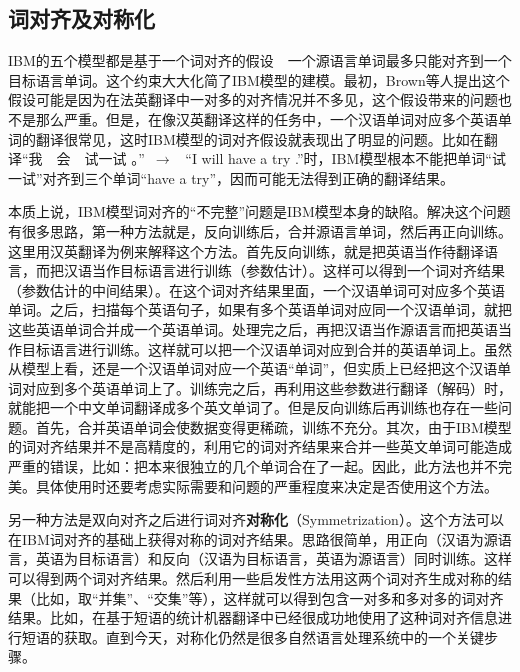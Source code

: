 \subsection{词对齐及对称化}

\parinterval IBM的五个模型都是基于一个词对齐的假设\ \dash \ 一个源语言单词最多只能对齐到一个目标语言单词。这个约束大大化简了IBM模型的建模。最初，Brown等人提出这个假设可能是因为在法英翻译中一对多的对齐情况并不多见，这个假设带来的问题也不是那么严重。但是，在像汉英翻译这样的任务中，一个汉语单词对应多个英语单词的翻译很常见，这时IBM模型的词对齐假设就表现出了明显的问题。比如在翻译``我\ \ 会\ \ 试一试 。''\ $\to$ \ ``I will have a try .''时，IBM模型根本不能把单词``试一试''对齐到三个单词``have a try''，因而可能无法得到正确的翻译结果。

\parinterval 本质上说，IBM模型词对齐的``不完整''问题是IBM模型本身的缺陷。解决这个问题有很多思路，第一种方法就是，反向训练后，合并源语言单词，然后再正向训练。这里用汉英翻译为例来解释这个方法。首先反向训练，就是把英语当作待翻译语言，而把汉语当作目标语言进行训练（参数估计）。这样可以得到一个词对齐结果（参数估计的中间结果）。在这个词对齐结果里面，一个汉语单词可对应多个英语单词。之后，扫描每个英语句子，如果有多个英语单词对应同一个汉语单词，就把这些英语单词合并成一个英语单词。处理完之后，再把汉语当作源语言而把英语当作目标语言进行训练。这样就可以把一个汉语单词对应到合并的英语单词上。虽然从模型上看，还是一个汉语单词对应一个英语``单词''，但实质上已经把这个汉语单词对应到多个英语单词上了。训练完之后，再利用这些参数进行翻译（解码）时，就能把一个中文单词翻译成多个英文单词了。但是反向训练后再训练也存在一些问题。首先，合并英语单词会使数据变得更稀疏，训练不充分。其次，由于IBM模型的词对齐结果并不是高精度的，利用它的词对齐结果来合并一些英文单词可能造成严重的错误，比如：把本来很独立的几个单词合在了一起。因此，此方法也并不完美。具体使用时还要考虑实际需要和问题的严重程度来决定是否使用这个方法。

\parinterval 另一种方法是双向对齐之后进行词对齐{\small\sffamily\bfseries{对称化}}（Symmetrization）。这个方法可以在IBM词对齐的基础上获得对称的词对齐结果。思路很简单，用正向（汉语为源语言，英语为目标语言）和反向（汉语为目标语言，英语为源语言）同时训练。这样可以得到两个词对齐结果。然后利用一些启发性方法用这两个词对齐生成对称的结果（比如，取``并集''、``交集''等），这样就可以得到包含一对多和多对多的词对齐结果。比如，在基于短语的统计机器翻译中已经很成功地使用了这种词对齐信息进行短语的获取。直到今天，对称化仍然是很多自然语言处理系统中的一个关键步骤。


